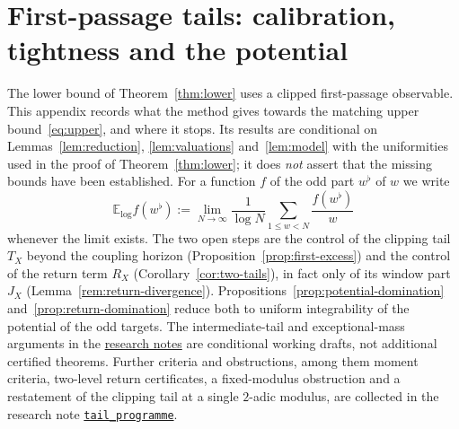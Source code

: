 \documentclass[12pt]{amsart}
\theoremstyle{definition}
\theoremstyle{remark}
\begin{document}
\section{First-passage tails: calibration, tightness and the potential}
\label{sec:tail-programme}
The lower bound of Theorem~\ref{thm:lower} uses a clipped first-passage
observable. This appendix records what the method gives towards the
matching upper bound~\eqref{eq:upper}, and where it stops. Its results
are conditional on Lemmas~\ref{lem:reduction}, \ref{lem:valuations}
and~\ref{lem:model} with the uniformities used in the proof of
Theorem~\ref{thm:lower}; it does \emph{not} assert that the missing bounds
have been established. For a function $f$ of the odd part $w^\flat$ of
$w$ we write
\[
  \mathbb E_{\log}f(w^\flat)
  :=\lim_{N\to\infty}\frac{1}{\log N}
  \sum_{1\le w<N}\frac{f(w^\flat)}{w}
\]
whenever the limit exists. The two open steps are the control of the
clipping tail $T_X$ beyond the coupling horizon
(Proposition~\ref{prop:first-excess}) and the
control of the return term $R_X$ (Corollary~\ref{cor:two-tails}), in fact only of its window part $J_X$ (Lemma~\ref{rem:return-divergence}). Propositions~\ref{prop:potential-domination} and~\ref{prop:return-domination} reduce both to uniform integrability of the potential of the odd targets. The
intermediate-tail and exceptional-mass arguments in the
\href{https://github.com/Sultanow/collatz/tree/master/07\%20Basins\%20of\%20Attraction/docs/research}{research notes}
are conditional working drafts, not additional certified theorems. Further criteria and obstructions, among them moment criteria, two-level return certificates, a fixed-modulus obstruction and a restatement of the clipping tail at a single $2$-adic modulus, are collected in the research note \href{https://github.com/Sultanow/collatz/tree/master/07\%20Basins\%20of\%20Attraction/docs/research/tail_programme}{\texttt{tail\_programme}}.
\end{document}
